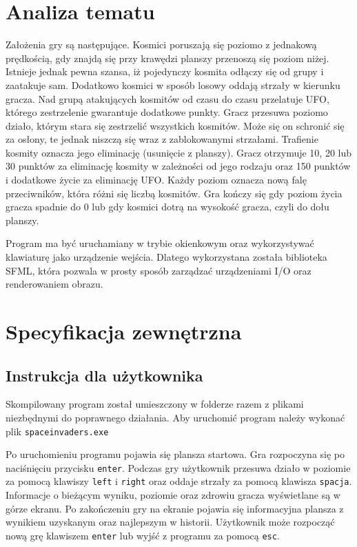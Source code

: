 \documentclass[12pt,a4paper]{article}
\begin{document}
\section{Analiza tematu}
Założenia gry są następujące. Kosmici poruszają się poziomo z jednakową prędkością, gdy znajdą się przy krawędzi planszy przenoszą się poziom niżej. Istnieje jednak pewna szansa, iż pojedynczy kosmita odłączy się od grupy i zaatakuje sam. Dodatkowo kosmici w sposób losowy oddają strzały w kierunku gracza. Nad grupą atakujących kosmitów od czasu do czasu przelatuje UFO, którego zestrzelenie gwarantuje dodatkowe punkty. Gracz przesuwa poziomo działo, którym stara się zestrzelić wszystkich kosmitów. Może się on schronić się za osłony, te jednak niszczą się wraz z zablokowanymi strzałami. Trafienie kosmity oznacza jego eliminację (usunięcie z planszy). Gracz otrzymuje 10, 20 lub 30 punktów za eliminację kosmity w zależności od jego rodzaju oraz 150 punktów i dodatkowe życie za eliminację UFO. Każdy poziom oznacza nową falę przeciwników, która różni się liczbą kosmitów. Gra kończy się gdy poziom życia gracza spadnie do 0 lub gdy kosmici dotrą na wysokość gracza, czyli do dołu planszy.

Program ma być uruchamiany w trybie okienkowym oraz wykorzystywać klawiaturę jako urządzenie wejścia. Dlatego wykorzystana została biblioteka SFML, która pozwala w prosty sposób zarządzać urządzeniami I/O oraz renderowaniem obrazu.

\section{Specyfikacja zewnętrzna}
\label{sec:sp:zewnetrzna}
\subsection{Instrukcja dla użytkownika}
Skompilowany program został umieszczony w folderze razem z plikami niezbędnymi do poprawnego działania. Aby uruchomić program należy wykonać plik \lstinline|spaceinvaders.exe|

Po uruchomieniu programu pojawia się plansza startowa. Gra rozpoczyna się po naciśnięciu przycisku \texttt{enter}. Podczas gry użytkownik przesuwa działo w poziomie za pomocą klawiszy \texttt{left} i \texttt{right} oraz oddaje strzały za pomocą klawisza \texttt{spacja}. Informacje o bieżącym wyniku, poziomie oraz zdrowiu gracza wyświetlane są w górze ekranu. Po zakończeniu gry na ekranie pojawia się informacyjna plansza z wynikiem uzyskanym oraz najlepszym w historii. Użytkownik może rozpocząć nową grę klawiszem \texttt{enter} lub wyjść z programu za pomocą \texttt{esc}.
\end{document}
